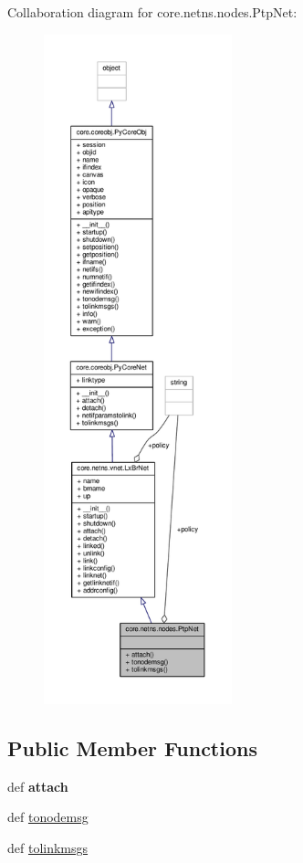 Collaboration diagram for core.\+netns.\+nodes.\+Ptp\+Net\+:
\nopagebreak
\begin{figure}[H]
\begin{center}
\leavevmode
\includegraphics[height=550pt]{classcore_1_1netns_1_1nodes_1_1_ptp_net__coll__graph}
\end{center}
\end{figure}
\subsection*{Public Member Functions}
\begin{DoxyCompactItemize}
\item 
\hypertarget{classcore_1_1netns_1_1nodes_1_1_ptp_net_a4b031774b301b5be00c31b4e4f5d1587}{def {\bfseries attach}}\label{classcore_1_1netns_1_1nodes_1_1_ptp_net_a4b031774b301b5be00c31b4e4f5d1587}

\item 
def \hyperlink{classcore_1_1netns_1_1nodes_1_1_ptp_net_a5a2c25291b8a592910da831153aa89ad}{tonodemsg}
\item 
def \hyperlink{classcore_1_1netns_1_1nodes_1_1_ptp_net_a2043770b25639148799be98c0ca0fdc5}{tolinkmsgs}
\end{DoxyCompactItemize}
